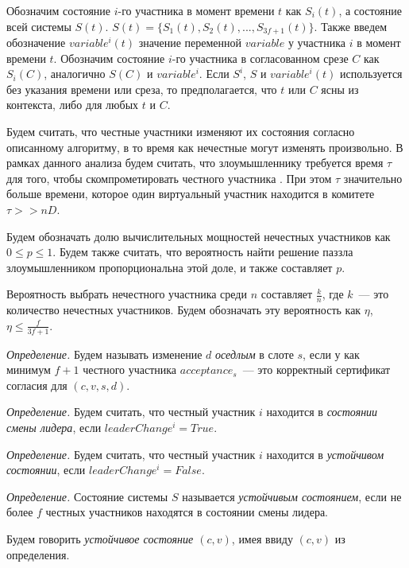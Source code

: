 Обозначим состояние $i$-го участника в момент времени $t$ как $S_i(t)$, а состояние всей системы $S(t)$. 
$S(t)=\{S_1(t), S_2(t),..., S_{3f+1}(t)\}$. Также введем обозначение $variable^i(t)$ значение переменной $variable$ у участника $i$ в момент времени $t$.
Обозначим состояние $i$-го участника в согласованном срезе $C$ как $S_i(C)$, аналогично $S(C)$ и $variable^i$.
Если $S^i$, $S$ и $variable^i(t)$ используется без указания времени или среза, то предполагается, что $t$ или $C$ ясны из контекста, либо для любых $t$ и $C$.

Будем считать, что честные участники изменяют их состояния согласно описанному алгоритму, в то время как нечестные могут изменять произвольно.
В рамках данного анализа будем считать, что злоумышленнику требуется время $\tau$ для того, чтобы скомпрометировать  честного участника \cite{hybrid-consensus}. При этом $\tau$ значительно больше времени, которое один виртуальный участник находится в комитете $\tau >> nD$.

Будем обозначать долю вычислительных мощностей нечестных участников как $0 \le p \le 1$. Будем также считать, что вероятность найти решение паззла злоумышленником пропорциональна этой доле, и также составляет $p$. 

Вероятность выбрать нечестного участника среди $n$ составляет $\frac{k}{n}$, где $k$~--- это количество нечестных участников. Будем обозначать эту вероятность как $\eta$, $\eta \le \frac{f}{3f+1}$.
\vspace{10pt}

\textit{Определение.} Будем называть изменение $d$ \textit{оседлым} в слоте $s$, если у как минимум $f+1$ честного участника $acceptance_s$~--- это корректный сертификат согласия для $(c, v, s, d)$.

\textit{Определение.} Будем считать, что честный участник $i$ находится в \textit{состоянии смены лидера}, если $leaderChange^i = True$.

\textit{Определение.} Будем считать, что честный участник $i$ находится в \textit{устойчивом состоянии}, если $leaderChange^i = False$.

\textit{Определение.} Состояние системы $S$ называется \textit{устойчивым состоянием}, если не более $f$ честных участников находятся в состоянии смены лидера. 

Будем говорить \textit{устойчивое состояние $(c, v)$}, имея ввиду $(c, v)$ из определения.

